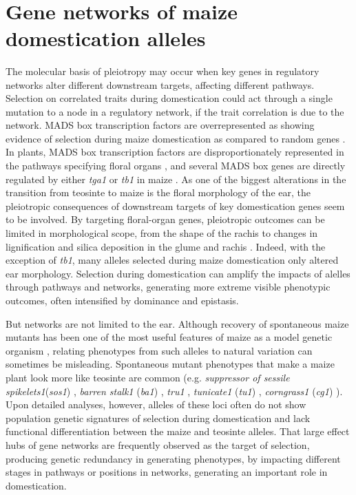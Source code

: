 \documentclass[a4paper]{article}
\newcommand{\mcs}[1]{\todo[size=\tiny, color=magenta!20]{#1}}
\begin{document}
﻿\section*{Gene networks of maize domestication alleles}



﻿The molecular basis of pleiotropy may occur when key genes in regulatory networks alter different downstream targets, affecting different pathways.
Selection on correlated traits during domestication could act through a single mutation to a node in a regulatory network, if the trait correlation is due to the network.
 MADS box transcription factors are overrepresented as showing evidence of selection during maize domestication as compared to random genes \citep{zhao2011}.
In plants, MADS box transcription factors are disproportionately represented in the pathways specifying floral organs \citep{theissen2001}, and several MADS box genes are directly regulated by either \textit{tga1} or \textit{tb1} in maize \citep{wang2015, studer2017}.
As one of the biggest alterations in the transition from teosinte to maize is the floral morphology of the ear, the pleiotropic consequences of downstream targets of key domestication genes seem to be involved.
By targeting floral-organ genes, pleiotropic outcomes can be limited in morphological scope, from the shape of the rachis to changes in lignification and silica deposition in the glume and rachis \citep{doebley1996, dorweiler1997}.
Indeed, with the exception of \textit{tb1}, many alleles selected during maize domestication only altered ear morphology.
Selection during domestication can amplify the impacts of alelles through pathways and networks, generating more extreme visible phenotypic outcomes, often intensified by dominance and epistasis.

﻿But networks are not limited to the ear.
﻿Although recovery of spontaneous maize mutants has been one of the most useful features of maize as a model genetic organism \citep{strable2009, nannas2015}, relating phenotypes from such alleles to natural variation can sometimes be misleading.
Spontaneous mutant phenotypes that make a maize plant look more like teosinte are common (e.g. \textit{suppressor of sessile spikelets1}(\textit{sos1}) \citep{doebley1995sos1}, \textit{barren stalk1} (\textit{ba1}) \citep{gallavotti2004}, \textit{tru1} \citep{dong2017}, \textit{tunicate1} (\textit{tu1}) \citep{wingen2012}, \textit{corngrass1} (\textit{cg1}) \citep{chuck2007}).
Upon detailed analyses, however, alleles of these loci often do not show population genetic signatures of selection during domestication and lack functional differentiation between the maize and teosinte alleles.
That large effect hubs of gene networks are frequently observed as the target of selection, producing genetic redundancy in generating phenotypes,  by impacting different stages in pathways or positions in networks, generating an important role in domestication. %
\mcs{recheck, anne is right}
\end{document}
